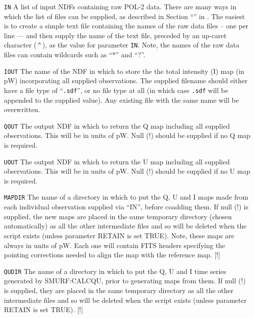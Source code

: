 \begin{aligndesc}
\item[\texttt{IN}] A list of input NDFs containing raw POL-2 data.
  There are many ways in which the list of files can be supplied, as
  described in Section ``'' in . The
  easiest is to create a simple text file containing the names of the
  raw data files -- one per line --- and then supply the name of the
  text file, preceded by an up-caret character (\,\texttt{\^{}}\,), as
  the value for parameter \texttt{IN}. Note, the names of the raw data
  files can contain wildcards such as ``$*$'' and ``?''.

\item[\texttt{IOUT}] The name of the NDF in which to store the the
  total intensity (I) map (in pW) incorporating all supplied observations.
  The supplied filename should either have a file type of
  ``\texttt{.sdf}'', or no file type at all (in which case
  \texttt{.sdf} will be appended to the supplied value). Any existing
  file with the same name will be overwritten.

\item[\texttt{QOUT}] The output NDF in which to return the Q map
  including all supplied observations. This will be in units of
  pW. Null (!) should be supplied if no Q map is required.


\item[\texttt{UOUT}] The output NDF in which to return the U map
  including all supplied observations. This will be in units of
  pW. Null (!) should be supplied if no U map is required.

\item[\texttt{MAPDIR}] The name of a directory in which to put the Q,
  U and I maps made from each individual observation supplied via
  ``IN'', before coadding them. If null (!) is supplied, the new maps are
  placed in the same temporary directory (chosen automatically) as all the
  other intermediate files and so will be deleted when the script exists
  (unless parameter RETAIN is set TRUE). Note, these maps are always in
  units of pW. Each one will contain FITS headers specifying the pointing
  corrections needed to align the map with the reference map. [!]


\item[\texttt{QUDIR}] The name of a directory in which to put the Q, U
  and I time series generated by SMURF:CALCQU, prior to generating
  maps from them. If null (!) is supplied, they are placed in the same
  temporary directory as all the other intermediate files and so will
  be deleted when the script exists (unless parameter RETAIN is set
  TRUE). [!]
\end{aligndesc}

